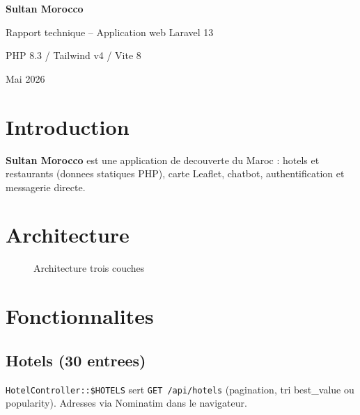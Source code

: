\documentclass[12pt,a4paper,oneside]{report}
\begin{document}
\begin{titlepage}
\centering
\vspace*{2cm}
{\Huge\bfseries\color{SultanTeal} Sultan Morocco\par}
\vspace{1cm}
{\Large Rapport technique -- Application web Laravel 13\par}
\vspace{2cm}
{\large PHP 8.3 / Tailwind v4 / Vite 8\par}
\vfill
{\large Mai 2026\par}
\end{titlepage}

\tableofcontents
\cleardoublepage

\chapter{Introduction}
\textbf{Sultan Morocco} est une application de decouverte du Maroc : hotels et restaurants (donnees statiques PHP), carte Leaflet, chatbot, authentification et messagerie directe.

\chapter{Architecture}
\begin{figure}[H]
\centering
{}
\caption{Architecture trois couches}
\end{figure}

\chapter{Fonctionnalites}
\section{Hotels (30 entrees)}
\texttt{HotelController::\$HOTELS} sert \texttt{GET /api/hotels} (pagination, tri best\_value ou popularity). Adresses via Nominatim dans le navigateur.
\end{document}
